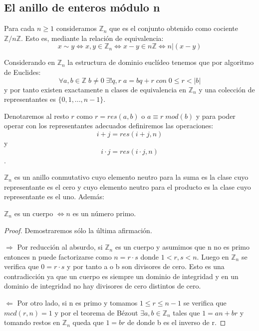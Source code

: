 \subsection{El anillo de enteros módulo n}

Para cada $n \ge 1$ consideramos $\mathbb{Z}_n$ que es el conjunto obtenido como cociente $\mathbb{Z}/n\mathbb{Z}$. Esto es, mediante la relación de equivalencia: $$x \sim y \iff x,y \in \mathbb{Z}_n \iff x-y \in n\mathbb{Z} \iff n | (x-y)$$

Considerando en $\mathbb{Z}_n$ la estructura de dominio euclídeo tenemos que por algoritmo de Euclides: $$\forall a,b \in \mathbb{Z} \; b \neq 0 \; \exists! q,r \; a = bq+r \; con \; 0 \leq r < |b| $$ y por tanto existen exactamente n clases de equivalencia en $\mathbb{Z}_n$ y una colección de representantes es $\{0,1,...,n-1\}$.

Denotaremos al resto $r$ como $r = res(a,b)$ o $a \equiv r \; mod(b)$ y para poder operar con los representantes adecuados definiremos las operaciones: $$i+j = res(i+j,n)$$ y $$i \cdot j = res(i \cdot j,n)$$.

\begin{nprop}
$\mathbb{Z}_n$ es un anillo conmutativo cuyo elemento neutro para la suma es la clase cuyo representante es el cero y cuyo elemento neutro para el producto es la clase cuyo representante es el uno. Además:

$\mathbb{Z}_n$ es un cuerpo $\iff n$ es un número primo.
\end{nprop}

\begin{proof}

Demostraremos sólo la última afirmación. 

$\Rightarrow$ Por reducción al absurdo, si $\mathbb{Z}_n$ es un cuerpo y asumimos que n no es primo entonces n puede factorizarse como $n = r \cdot s$ donde $1 < r,s < n$. Luego en $\mathbb{Z}_n$ se verifica que $0 = r \cdot s$ y por tanto a o b son divisores de cero. Esto es una contradicción ya que un cuerpo es siempre un dominio de integridad y en un dominio de integridad no hay divisores de cero distintos de cero.

$\Leftarrow$ Por otro lado, si n es primo y tomamos $1 \leq r \leq n-1$ se verifica que $mcd(r,n) = 1$ y por el teorema de Bézout $\exists a,b \in \mathbb{Z}_n$ tales que $1 = an + br$ y tomando restos en $\mathbb{Z}_n$ queda que $1 = br$ de donde b es el inverso de r.

\end{proof}


